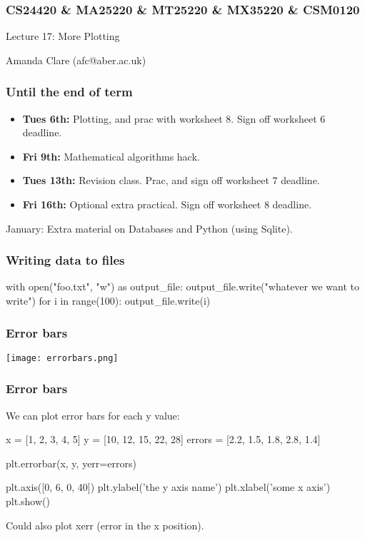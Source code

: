 \documentclass{beamer}
\begin{document}
\begin{frame}
\frametitle{CS24420 \& MA25220 \& MT25220 \& MX35220 \& CSM0120}

\begin{center}
\begin{huge}
Lecture 17: More Plotting
\end{huge}
\bigskip

Amanda Clare (afc@aber.ac.uk)

\end{center}
\end{frame}

\begin{frame}[fragile]
\frametitle{Until the end of term}
\begin{itemize}
\item \textbf{Tues 6th:} Plotting, and prac with worksheet 8. Sign off worksheet 6 deadline.
\item \textbf{Fri 9th:} Mathematical algorithms hack.
\item \textbf{Tues 13th:} Revision class. Prac, and sign off worksheet 7 deadline.
\item \textbf{Fri 16th:} Optional extra practical. Sign off worksheet 8 deadline.
\end{itemize}
January: Extra material on Databases and Python (using Sqlite).
\end{frame}


\begin{frame}[fragile]
\frametitle{Writing data to files}
\begin{code}
with open("foo.txt", "w") as output_file:
    output_file.write("whatever we want to write\n")
    for i in range(100):
        output_file.write(i)
\end{code}
\end{frame}


\begin{frame}[fragile]
\frametitle{Error bars}
\texttt{[image: errorbars.png]}
\end{frame}


\begin{frame}[fragile]
\frametitle{Error bars}

We can plot error bars for each y value:

\begin{code}
x = [1, 2, 3, 4, 5]
y = [10, 12, 15, 22, 28]
errors = [2.2, 1.5, 1.8, 2.8, 1.4]

plt.errorbar(x, y, yerr=errors)

plt.axis([0, 6, 0, 40])
plt.ylabel('the y axis name')
plt.xlabel('some x axis')
plt.show()
\end{code}

Could also plot xerr (error in the x position). 
\end{frame}
\end{document}
